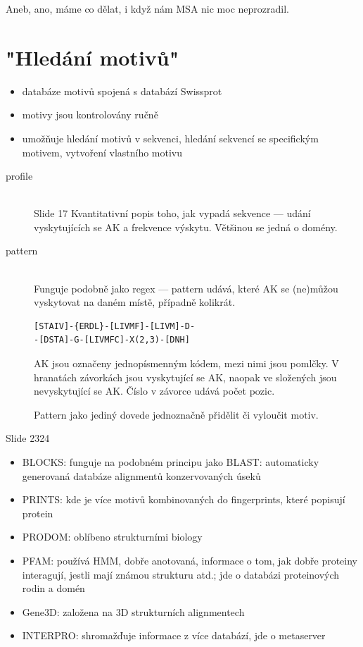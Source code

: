 \documentclass[DIV=8]{scrreprt}
\begin{document}
Aneb, ano, máme co dělat, i když nám MSA nic moc neprozradil.

\section{"Hledání motivů"}

\begin{itemize}
    \item databáze motivů spojená s databází Swissprot
    \item motivy jsou kontrolovány ručně
    \item umožňuje hledání motivů v sekvenci, hledání sekvencí se specifickým motivem, vytvoření vlastního motivu
\end{itemize}


\begin{description}
\item[profile]\hfill \\
Slide 17
Kvantitativní popis toho, jak vypadá sekvence --- udání vyskytujících se AK a frekvence výskytu. Většinou se jedná o domény.


\item[pattern]\hfill \\
Funguje podobně jako regex --- pattern udává, které AK se (ne)můžou vyskytovat na daném místě, případně kolikrát.

\begin{lstlisting}
[STAIV]-{ERDL}-[LIVMF]-[LIVM]-D-
-[DSTA]-G-[LIVMFC]-X(2,3)-[DNH]\end{lstlisting}

AK jsou označeny jednopísmenným kódem, mezi nimi jsou pomlčky. V hranatách závorkách jsou vyskytující se AK, naopak ve složených jsou nevyskytující se AK. Číslo v závorce udává počet pozic.

Pattern jako jediný dovede jednoznačně přidělit či vyloučit motiv.

\end{description}


Slide 2324
\begin{itemize}
    \item BLOCKS: funguje na podobném principu jako BLAST: automaticky generovaná databáze alignmentů konzervovaných úseků
    \item PRINTS: kde je více motivů kombinovaných do fingerprints, které popisují protein
    \item PRODOM: oblíbeno strukturními biology
    \item PFAM: používá HMM, dobře anotovaná, informace o tom, jak dobře proteiny interagují, jestli mají známou strukturu atd.; jde o databázi proteinových rodin a domén
    \item Gene3D: založena na 3D strukturních alignmentech
    \item INTERPRO: shromažďuje informace z více databází, jde o metaserver
\end{itemize}
\end{document}
